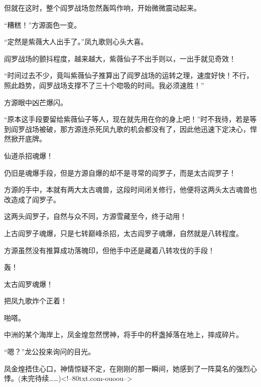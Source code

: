 \begin{this_body}
但就在这时，整个阎罗战场忽然轰鸣作响，开始微微震动起来。

“糟糕！”方源面色一变。

“定然是紫薇大人出手了。”凤九歌则心头大喜。

阎罗战场的颤抖程度，越来越大，紫薇仙子不出手则以，一出手就见奇效！

“时间过去不少，竟叫紫薇仙子推算出了阎罗战场的运转之理，速度好快！不行，照此趋势，阎罗战场支撑不了三十个唿吸的时间。我必须速胜！”

方源眼中凶芒爆闪。

“原本这手段要留给紫薇仙子等人，现在就先用在你的身上吧！”时不我待，若是等到阎罗战场被破，那方源连杀死凤九歌的机会都没有了，因此他迅速下定决心，悍然掀开底牌。

仙道杀招魂爆！

仍旧是魂爆手段，但是方源自爆的却不是寻常的阎罗子，而是太古阎罗子！

方源的手中，本就有两大太古魂兽，这段时间闭关修行，他便将这两头太古魂兽也改造成了阎罗子。

这两头阎罗子，自然与众不同，方源雪藏至今，终于动用！

上古阎罗子魂爆，只是七转巅峰杀招，太古阎罗子魂爆，自然就是八转程度。

方源虽然没有推算成功落魄印，但他手中还是藏着八转攻伐的手段！

轰！

太古阎罗魂爆！

把凤九歌炸个正着！

啪嗒。

中洲的某个海岸上，凤金煌忽然愣神，将手中的杯盏掉落在地上，摔成碎片。

“嗯？”龙公投来询问的目光。

凤金煌捂住心口，神情惊疑不定，在刚刚的那一瞬间，她感到了一阵莫名的强烈心悸。(未完待续……)<!--80txt.com-ouoou-->

\end{this_body}

